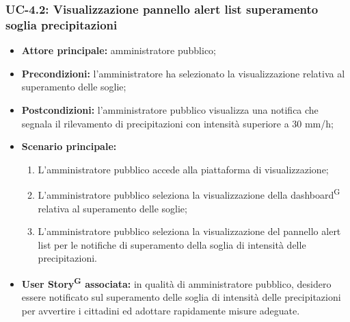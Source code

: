 \documentclass[8pt]{article}
\newcommand{\glossterm}[1]{#1\textsuperscript{G}} %
\begin{document}
\subsubsection*{UC-4.2: Visualizzazione pannello alert list superamento soglia precipitazioni}
\begin{itemize}
    \item \textbf{Attore principale:} amministratore pubblico;
    \item \textbf{Precondizioni:} l'amministratore ha selezionato la visualizzazione relativa al superamento delle soglie;
    \item \textbf{Postcondizioni:} l’amministratore pubblico visualizza una notifica che segnala il rilevamento di precipitazioni con intensità superiore a 30 mm/h;
    \item \textbf{Scenario principale:}
        \begin{enumerate}
        \item L’amministratore pubblico accede alla piattaforma di visualizzazione;
        \item L’amministratore pubblico seleziona la visualizzazione della \glossterm{dashboard} relativa al superamento delle soglie;
        \item L'amministratore pubblico seleziona la visualizzazione del pannello alert list per le notifiche di superamento della soglia di intensità delle precipitazioni.
        \end{enumerate}
    \item \textbf{\glossterm{User Story} associata:} in qualità di amministratore pubblico, desidero essere notificato sul superamento delle soglia di intensità delle precipitazioni per avvertire i cittadini ed adottare rapidamente misure adeguate.
\end{itemize}
\end{document}

